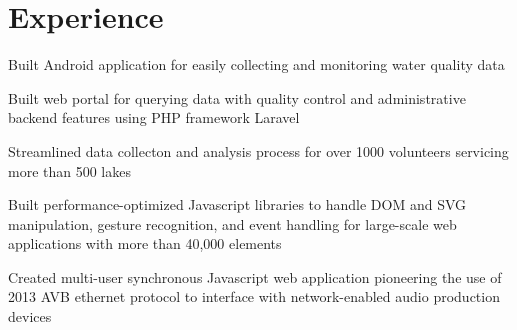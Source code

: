 \documentclass[letterpaper]{deedy-resume} %
\begin{document}
%
\begin{minipage}[t]{0.66\textwidth} %


\section{Experience}


\vspace{\topsep} %
\begin{tightitemize}
\item Built Android application for easily collecting and monitoring water quality data
\item Built web portal for querying data with quality control and administrative backend features using PHP framework Laravel
\item Streamlined data collecton and analysis process for over 1000 volunteers servicing more than 500 lakes

\end{tightitemize}

\sectionspace %



\begin{tightitemize}
\item Built performance-optimized Javascript libraries to handle DOM and SVG manipulation, gesture recognition, and event handling for large-scale web applications with more than 40,000 elements
\item Created multi-user synchronous Javascript web application pioneering the use of 2013 AVB ethernet protocol to interface with network-enabled audio production devices
\end{tightitemize}

\sectionspace %


\end{minipage}
\end{document}
